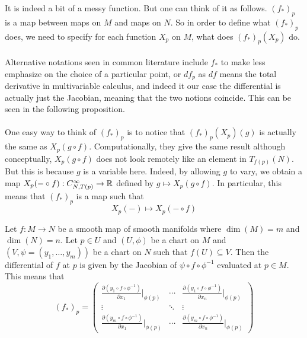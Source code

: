\documentclass[a4paper]{article}
\begin{document}
It is indeed a bit of a messy function. But one can think of it as follows. $(f_\ast)_p$ is a map between maps on $M$ and maps on $N$. So in order to define what $(f_\ast)_p$ does, we need to specify for each function $X_p$ on $M$, what does $(f_\ast)_p(X_p)$ do. \\~\\

Alternative notations seen in common literature include $f_\ast$ to make less emphasize on the choice of a particular point, or $df_p$ as $df$ means the total derivative in multivariable calculus, and indeed it our case the differential is actually just the Jacobian, meaning that the two notions coincide. This can be seen in the following proposition. \\~\\

One easy way to think of $(f_\ast)_p$ is to notice that $(f_\ast)_p(X_p)(g)$ is actually the same as $X_p(g\circ f)$. Computationally, they give the same result although conceptually, $X_p(g\circ f)$ does not look remotely like an element in $T_{f(p)}(N)$. But this is because $g$ is a variable here. Indeed, by allowing $g$ to vary, we obtain a map $X_p(-\circ f):C_{N,T(p)}^\infty\to\mathbb{R}$ defined by $g\mapsto X_p(g\circ f)$. In particular, this means that $(f_\ast)_p$ is a map such that $$X_p(-)\mapsto X_p(-\circ f)$$

\begin{thm}{}{} Let $f:M\to N$ be a smooth map of smooth manifolds where $\dim(M)=m$ and $\dim(N)=n$. Let $p\in U$ and $(U,\phi)$ be a chart on $M$ and $(V,\psi=(y_1,\dots,y_m))$ be a chart on $N$ such that $f(U)\subseteq V$. Then the differential of $f$ at $p$ is given by the Jacobian of $\psi\circ f\circ\phi^{-1}$ evaluated at $p\in M$. This means that $$(f_\ast)_p=\begin{pmatrix}
\frac{\partial(y_1\circ f\circ\phi^{-1})}{\partial x_1}|_{\phi(p)} & \cdots & \frac{\partial (y_1\circ f\circ\phi^{-1})}{\partial x_n}|_{\phi(p)}\\
\vdots & \ddots & \vdots\\
\frac{\partial(y_m\circ f\circ\phi^{-1})}{\partial x_1}|_{\phi(p)} & \cdots & \frac{\partial (y_m\circ f\circ\phi^{-1})}{\partial x_n}|_{\phi(p)}
\end{pmatrix}$$
\end{thm}
\end{document}
